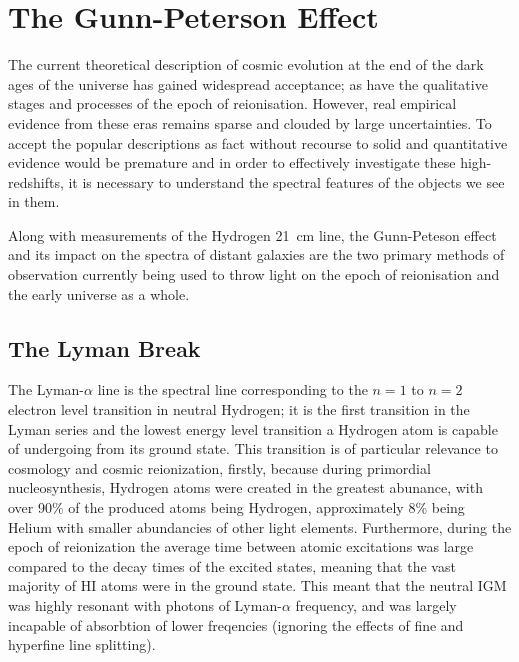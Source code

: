 
\section{The Gunn-Peterson Effect} %
\label{sec:the_gunn_peterson_effect}
	The current theoretical description of cosmic evolution at the end of the dark ages of the universe has gained widespread acceptance; as have the qualitative stages and processes of the epoch of reionisation. However, real empirical evidence from these eras remains sparse and clouded by large uncertainties. To accept the popular descriptions as fact without recourse to solid and quantitative evidence would be premature and in order to effectively investigate these high-redshifts, it is necessary to understand the spectral features of the objects we see in them.

	Along with measurements of the Hydrogen \SI{21}{\centi\metre} line, the Gunn-Peteson effect and its impact on the spectra of distant galaxies are the two primary methods of observation currently being used to throw light on the epoch of reionisation and the early universe as a whole.

	\subsection{The Lyman Break} %
	\label{sub:the_lyman_break}
		The Lyman-$\alpha$ line is the spectral line corresponding to the $n=1$ to $n=2$ electron level transition in neutral Hydrogen; it is the first transition in the Lyman series and the lowest energy level transition a Hydrogen atom is capable of undergoing from its ground state. This transition is of particular relevance to cosmology and cosmic reionization, firstly, because during primordial nucleosynthesis, Hydrogen atoms were created in the greatest abunance, with over 90\% of the produced atoms being Hydrogen, approximately 8\% being Helium with smaller abundancies of other light elements. Furthermore, during the epoch of reionization the average time between atomic excitations was large compared to the decay times of the excited states, meaning that the vast majority of HI atoms were in the ground state. This meant that the neutral IGM was highly resonant with photons of Lyman-$\alpha$ frequency, and was largely incapable of absorbtion of lower freqencies (ignoring the effects of fine and hyperfine line splitting).


